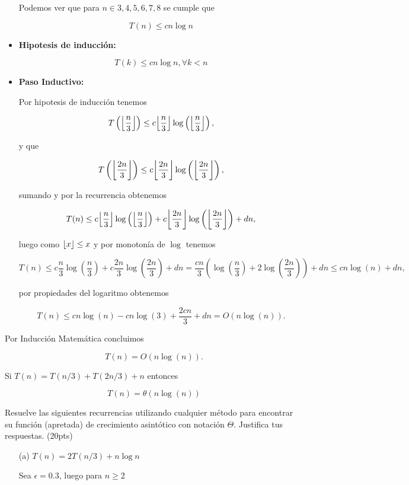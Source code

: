 \documentclass[answers,11pt]{exam}
\DeclarePairedDelimiter\floor{\lfloor}{\rfloor}
\begin{document}
\begin{questions}
\begin{itemize}
    Podemos ver que para $n \in {3,4,5,6,7,8}$ se cumple que

    \[T(n) \leq cn\log n\]

    \item \textbf{Hipotesis de inducción:}
    
    \[T(k) \leq cn\log n, \forall k < n\]

    \item \textbf{Paso Inductivo:}
    
    Por hipotesis de inducción tenemos

    \[T\left(\floor*{\frac{n}{3}}\right)\leq c\floor*{\frac{n}{3}}\log\left(\floor*{\frac{n}{3}}\right),\]

    y que

    \[T\left(\floor*{\frac{2n}{3}}\right)\leq c\floor*{\frac{2n}{3}}\log\left(\floor*{\frac{2n}{3}}\right),\]

    sumando y por la recurrencia obtenemos

    \[T(n) \leq c\floor*{\frac{n}{3}}\log\left(\floor*{\frac{n}{3}}\right) + c\floor*{\frac{2n}{3}}\log\left(\floor*{\frac{2n}{3}}\right) + dn,\]

    luego como $\floor*{x} \leq x$ y por monotonía de $\log$ tenemos

    \[T(n) \leq c\frac{n}{3}\log\left(\frac{n}{3}\right) + c\frac{2n}{3}\log\left(\frac{2n}{3}\right) + dn = \frac{cn}{3}\left(\log\left(\frac{n}{3}\right) + 2\log\left(\frac{2n}{3}\right)\right) + dn \leq cn\log(n) + dn,\]

    por propiedades del logaritmo obtenemos

    \[T(n) \leq cn\log(n) - cn\log(3) + \frac{2cn}{3} + dn = O(n\log(n)).\]
\end{itemize}

Por Inducción Matemática concluimos

\[T(n) = O(n\log(n)).\]

Si $T(n) = T(n/3) + T(2n/3) + n$ entonces

\[T(n) = \theta(n\log(n))\]

\question 
Resuelve las siguientes recurrencias utilizando cualquier m\'etodo para encontrar su funci\'on (apretada) de crecimiento asint\'otico con notaci\'on $\Theta$. Justifica tus respuestas. (20pts)

\begin{itemize}
\item[(a)]{$T(n) = 2T(n/3) + n\log n$}

Sea $\epsilon = 0.3$, luego para $n \geq 2$


\end{itemize}
\end{questions}
\end{document}
